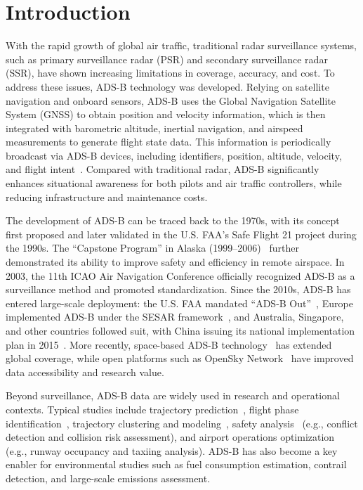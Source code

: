 \section{Introduction}

With the rapid growth of global air traffic, traditional radar surveillance systems, such as primary surveillance radar (PSR) and secondary surveillance radar (SSR), have shown increasing limitations in coverage, accuracy, and cost. To address these issues, ADS-B technology was developed. Relying on satellite navigation and onboard sensors, ADS-B uses the Global Navigation Satellite System (GNSS) to obtain position and velocity information, which is then integrated with barometric altitude, inertial navigation, and airspeed measurements to generate flight state data. This information is periodically broadcast via ADS-B devices, including identifiers, position, altitude, velocity, and flight intent~\cite{olive2024filtering}. Compared with traditional radar, ADS-B significantly enhances situational awareness for both pilots and air traffic controllers, while reducing infrastructure and maintenance costs.

The development of ADS-B can be traced back to the 1970s, with its concept first proposed and later validated in the U.S. FAA’s Safe Flight 21 project during the 1990s. The “Capstone Program” in Alaska (1999–2006)~\cite{faa2000capstone} further demonstrated its ability to improve safety and efficiency in remote airspace. In 2003, the 11th ICAO Air Navigation Conference officially recognized ADS-B as a surveillance method and promoted standardization. Since the 2010s, ADS-B has entered large-scale deployment: the U.S. FAA mandated “ADS-B Out”~\cite{cfr91-225}, Europe implemented ADS-B under the SESAR framework~\cite{undertaking2009european}, and Australia, Singapore, and other countries followed suit, with China issuing its national implementation plan in 2015~\cite{caac2015adsb}. More recently, space-based ADS-B technology~\cite{melero2024satera} has extended global coverage, while open platforms such as OpenSky Network~\cite{schafer2014bringing} have improved data accessibility and research value.

Beyond surveillance, ADS-B data are widely used in research and operational contexts. Typical studies include trajectory prediction~\cite{wang2021performance,corrado2021clustering}, flight phase identification~\cite{schlosser2024analysis}, trajectory clustering and modeling~\cite{guleriamachine}, safety analysis~\cite{noh2018aviation} (e.g., conflict detection and collision risk assessment), and airport operations optimization~\cite{roosenbrand2023contrail} (e.g., runway occupancy and taxiing analysis). ADS-B has also become a key enabler for environmental studies such as fuel consumption estimation, contrail detection, and large-scale emissions assessment.


